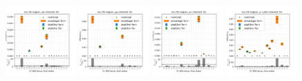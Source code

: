 \begin{figure}
    \includegraphics[width=0.24\textwidth]{chapters/Appendix/sectionTTSyst/figures/afterCorr/icata1_ch0_fsr.png}
    \includegraphics[width=0.24\textwidth]{chapters/Appendix/sectionTTSyst/figures/afterCorr/icata1_ch1_fsr.png}
    \includegraphics[width=0.24\textwidth]{chapters/Appendix/sectionTTSyst/figures/afterCorr/icata1_ch2_fsr.png}
    \includegraphics[width=0.24\textwidth]{chapters/Appendix/sectionTTSyst/figures/afterCorr/icata1_ch3_fsr.png}
    

\end{figure}
